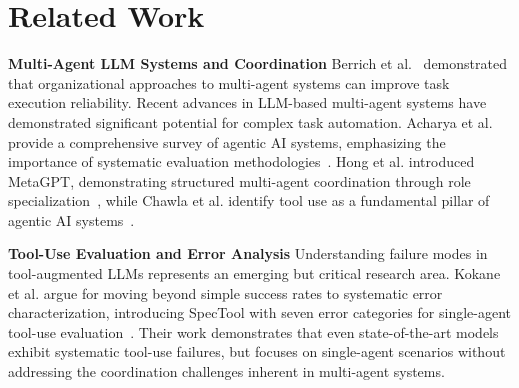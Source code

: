 \documentclass[conference]{IEEEtran}
\begin{document}
\section{Related Work}
\label{sec:Related}


\noindent\textbf{Multi-Agent LLM Systems and Coordination}
Berrich et al.~\cite{berrich2012integration} demonstrated that organizational approaches to multi-agent systems can improve task execution reliability.
Recent advances in LLM-based multi-agent systems have demonstrated significant potential for complex task automation. Acharya et al. provide a comprehensive survey of agentic AI systems, emphasizing the importance of systematic evaluation methodologies~\cite{acharya2025agentic}. Hong et al. introduced MetaGPT, demonstrating structured multi-agent coordination through role specialization~\cite{hong2024metagpt}, while Chawla et al. identify tool use as a fundamental pillar of agentic AI systems~\cite{chawla2024agentic}. %

\noindent \textbf{Tool-Use Evaluation and Error Analysis}
Understanding failure modes in tool-augmented LLMs represents an emerging but critical research area. Kokane et al. argue for moving beyond simple success rates to systematic error characterization, introducing SpecTool with seven error categories for single-agent tool-use evaluation~\cite{kokane2024spectool}. Their work demonstrates that even state-of-the-art models exhibit systematic tool-use failures, but focuses on single-agent scenarios without addressing the coordination challenges inherent in multi-agent systems.
\end{document}
